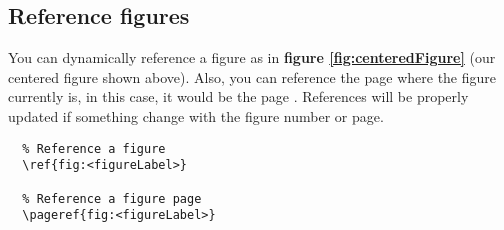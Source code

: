 \subsection{Reference figures}

You can dynamically reference a figure as in \textbf{figure \ref{fig:centeredFigure}} (our centered figure shown above). Also, you can reference the page where the figure currently is, in this case, it would be the page \textbf{\pageref{fig:centeredFigure}}. References will be properly updated if something change with the figure number or page.

\begin{lstlisting}
  % Reference a figure
  \ref{fig:<figureLabel>}

  % Reference a figure page
  \pageref{fig:<figureLabel>}
\end{lstlisting}